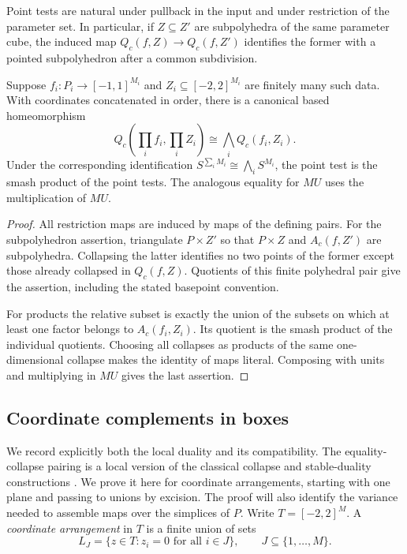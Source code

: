 \begin{lemma}\label{lem:point-test-products}
Point tests are natural under pullback in the input and under restriction
of the parameter set.  In particular, if $Z\subseteq Z'$ are
subpolyhedra of the same parameter cube, the induced map
$Q_c(f,Z)\to Q_c(f,Z')$ identifies the former with a pointed
subpolyhedron after a common subdivision.

Suppose $f_i:P_i\to[-1,1]^{M_i}$ and
$Z_i\subseteq[-2,2]^{M_i}$ are finitely many such data.  With coordinates
concatenated in order, there is a canonical based homeomorphism
\begin{equation}\label{eq:point-test-product-quotient}
 Q_c\left(\prod_i f_i,\prod_i Z_i\right)
 \cong\bigwedge_i Q_c(f_i,Z_i).
\end{equation}
Under the corresponding identification
$S^{\sum_iM_i}\cong\bigwedge_i S^{M_i}$, the point test is the smash
product of the point tests.  The analogous equality for $MU$ uses the
multiplication of $MU$.
\end{lemma}

\begin{proof}
All restriction maps are induced by maps of the defining pairs.  For the
subpolyhedron assertion, triangulate $P\times Z'$ so that $P\times Z$
and $A_c(f,Z')$ are subpolyhedra.  Collapsing the latter identifies no two
points of the former except those already collapsed in $Q_c(f,Z)$.
Quotients of this finite polyhedral pair give the assertion, including
the stated basepoint convention.

For products the relative subset is exactly the union of the subsets
on which at least one factor belongs to $A_c(f_i,Z_i)$.  Its quotient
is the smash product of the individual quotients.  Choosing all
collapses as products of the same one-dimensional collapse makes the
identity of maps literal.  Composing with units and multiplying in
$MU$ gives the last assertion.
\end{proof}

\subsection{Coordinate complements in boxes}

We record explicitly both the local duality and its compatibility.
The equality-collapse pairing is a local version of the classical
collapse and stable-duality constructions \cite{Thom1954,Atiyah1961Thom}.
We prove it here for coordinate arrangements, starting with one plane
and passing to unions by excision.  The proof will also identify the
variance needed to assemble maps over the simplices of $P$.
Write $T=[-2,2]^M$.  A \emph{coordinate arrangement} in $T$ is a finite
union of sets
\[
 L_J=\{z\in T:z_i=0\text{ for all }i\in J\},
 \qquad J\subseteq\{1,\ldots,M\}.
\]


